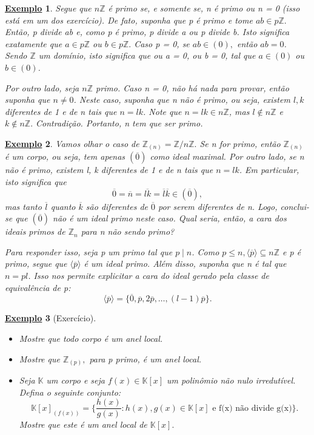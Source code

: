 \documentclass{article}
\newtheorem{example}{\underline{Exemplo}}
\begin{document}
\begin{example}
  Segue que \(n \mathbb{Z}\) é primo se, e somente se, n é primo ou n = 0 (isso está em um dos exercício).
De fato, suponha que p é primo e tome \(ab\in p \mathbb{Z}.\) Então, p divide ab e, como p é primo, p divide a ou p divide b.
Isto significa exatamente que \(a\in p\mathbb{Z}\) ou \(b\in p \mathbb{Z}.\) Caso p = 0, se \(ab\in (0),\) então
 \(ab=0\). Sendo \(\mathbb{Z}\) um domínio, isto significa que ou a = 0, ou b = 0, tal que \(a\in (0)\) ou \(b\in (0)\).

  Por outro lado, seja \(n \mathbb{Z}\) primo. Caso  n = 0, não há nada para provar, então suponha que \(n\neq 0\).
Neste caso, suponha que n não é primo, ou seja, existem \(l, k\) diferentes de 1 e de n tais que \(n = lk\). Note que 
 \(n = lk\in n\mathbb{Z}\), mas \(l\not\in n \mathbb{Z}\) e \(k\not\in n \mathbb{Z}.\) Contradição. Portanto, n tem que ser primo.
\end{example}
\begin{example}
  Vamos olhar o caso de \(\mathbb{Z}_{(n)} = \mathbb{Z}/n \mathbb{Z}.\) Se n for primo, então \(\mathbb{Z}_{(n)}\) é um corpo, ou seja, tem apenas \((\overline{0})\) como 
ideal maximal. Por outro lado, se n não é primo, existem l, k diferentes de 1 e de n tais que \(n = lk\). Em particular, isto significa que 
  \[
    \overline{0} = \overline{n} = \overline{lk} = \overline{l}\overline{k}\in (\overline{0}),
  \]
mas tanto \(\overline{l}\) quanto \(\overline{k}\) são diferentes de \(\overline{0}\) por serem diferentes de n. Logo, conclui-se que \((\overline{0})\) não é
um ideal primo neste caso. Qual seria, então, a cara dos ideais primos de \(\mathbb{Z}_{n}\) para n não sendo primo?

  Para responder isso, seja p um primo tal que \(p\mid n\). Como \(p\leq n, \langle \overline{p} \rangle\subseteq n \mathbb{Z}\) e p é primo, segue que 
 \(\langle \overline{p} \rangle\) é um ideal primo. Além disso, suponha que n é tal que \(n = pl\). Isso nos permite explicitar a cara do ideal gerado pela classe
 de equivalência de p:
  \[
    \langle \overline{p} \rangle = \{\overline{0}, \overline{p}, 2\overline{p}, \dotsc , (l-1)\overline{p}\}.
  \]
\end{example} 
\begin{example}[Exercício]
  \begin{itemize}
    \item[1)] Mostre que todo corpo é um anel local.
    \item[2)] Mostre que \(\mathbb{Z}_{(p)},\) para p primo, é um anel local.
    \item[3)] Seja \(\mathbb{K}\) um corpo e seja \(f(x)\in \mathbb{K}[x]\) um polinômio não nulo irredutível.
      Defina o seguinte conjunto:
      \[
        \mathbb{K}[x]_{(f(x))} = \biggl\{\frac{h(x)}{g(x)}: h(x), g(x)\in \mathbb{K}[x] \text{ e f(x) não divide g(x)}\biggr\}.
      \]
      Mostre que este é um anel local de \(\mathbb{K}[x].\)
  \end{itemize}
\end{example}
\end{document}
